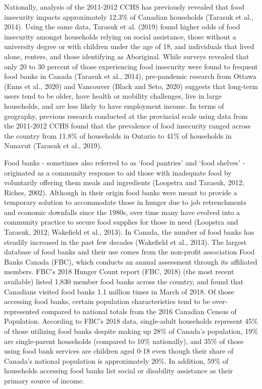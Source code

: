 \documentclass[]{elsarticle} %
\begin{document}
Nationally, analysis of the 2011-2012 CCHS has previously revealed that
food insecurity impacts approximately 12.3\% of Canadian households
(Tarasuk et al., 2014). Using the same data, Tarasuk et al. (2019) found
higher odds of food insecurity amongst households relying on social
assistance, those without a university degree or with children under the
age of 18, and individuals that lived alone, renters, and those
identifying as Aboriginal. While surveys revealed that only 20 to 30
percent of those experiencing food insecurity were found to frequent
food banks in Canada (Tarasuk et al., 2014), pre-pandemic research from
Ottawa (Enns et al., 2020) and Vancouver (Black and Seto, 2020) suggests
that long-term users tend to be older, have health or mobility
challenges, live in large households, and are less likely to have
employment income. In terms of geography, previous research conducted at
the provincial scale using data from the 2011-2012 CCHS found that the
prevalence of food insecurity ranged across the country from 11.8\% of
households in Ontario to 41\% of households in Nunavut (Tarasuk et al.,
2019).

Food banks - sometimes also referred to as `food pantries' and `food
shelves' - originated as a community response to aid those with
inadequate food by voluntarily offering them meals and ingredients
(Loopstra and Tarasuk, 2012; Riches, 2002). Although in their origin
food banks were meant to provide a temporary solution to accommodate
those in hunger due to job retrenchments and economic downfalls since
the 1980s, over time many have evolved into a community practice to
secure food supplies for those in need (Loopstra and Tarasuk, 2012;
Wakefield et al., 2013). In Canada, the number of food banks has
steadily increased in the past few decades (Wakefield et al., 2013). The
largest database of food banks and their use comes from the non-profit
association Food Banks Canada (FBC), which conducts an annual assessment
through its affiliated members. FBC's 2018 Hunger Count report (FBC,
2018) (the most recent available) listed 1,830 member food banks across
the country, and found that Canadians visited food banks 1.1 million
times in March of 2018. Of those accessing food banks, certain
population characteristics tend to be over-represented compared to
national totals from the 2016 Canadian Census of Population. According
to FBC's 2018 data, single-adult households represent 45\% of those
utilizing food banks despite making up 28\% of Canada's population, 19\%
are single-parent households (compared to 10\% nationally), and 35\% of
those using food bank services are children aged 0-18 even though their
share of Canada's national population is approximately 20\%. In
addition, 59\% of households accessing food banks list social or
disability assistance as their primary source of income.
\end{document}
